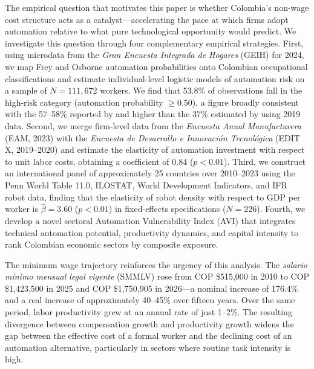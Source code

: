 The empirical question that motivates this paper is whether Colombia's non-wage cost structure acts as a catalyst---accelerating the pace at which firms adopt automation relative to what pure technological opportunity would predict. We investigate this question through four complementary empirical strategies. First, using microdata from the \textit{Gran Encuesta Integrada de Hogares} (GEIH) for 2024, we map Frey and Osborne automation probabilities \cite{frey2017future} onto Colombian occupational classifications and estimate individual-level logistic models of automation risk on a sample of $N = 111{,}672$ workers. We find that 53.8\% of observations fall in the high-risk category (automation probability $\geq 0.50$), a figure broadly consistent with the 57--58\% reported by \cite{fedesarrollo2023} and higher than the 37\% estimated by \cite{morales2023risk} using 2019 data. Second, we merge firm-level data from the \textit{Encuesta Anual Manufacturera} (EAM, 2023) with the \textit{Encuesta de Desarrollo e Innovaci\'on Tecnol\'ogica} (EDIT X, 2019--2020) and estimate the elasticity of automation investment with respect to unit labor costs, obtaining a coefficient of $0.84$ ($p < 0.01$). Third, we construct an international panel of approximately 25 countries over 2010--2023 using the Penn World Table 11.0, ILOSTAT, World Development Indicators, and IFR robot data, finding that the elasticity of robot density with respect to GDP per worker is $\hat{\beta} = 3.60$ ($p < 0.01$) in fixed-effects specifications ($N = 226$). Fourth, we develop a novel sectoral Automation Vulnerability Index (AVI) that integrates technical automation potential, productivity dynamics, and capital intensity to rank Colombian economic sectors by composite exposure.

The minimum wage trajectory reinforces the urgency of this analysis. The \textit{salario m\'inimo mensual legal vigente} (SMMLV) rose from COP \$515,000 in 2010 to COP \$1,423,500 in 2025 and COP \$1,750,905 in 2026---a nominal increase of 176.4\% and a real increase of approximately 40--45\% over fifteen years. Over the same period, labor productivity grew at an annual rate of just 1--2\%. The resulting divergence between compensation growth and productivity growth widens the gap between the effective cost of a formal worker and the declining cost of an automation alternative, particularly in sectors where routine task intensity is high.

